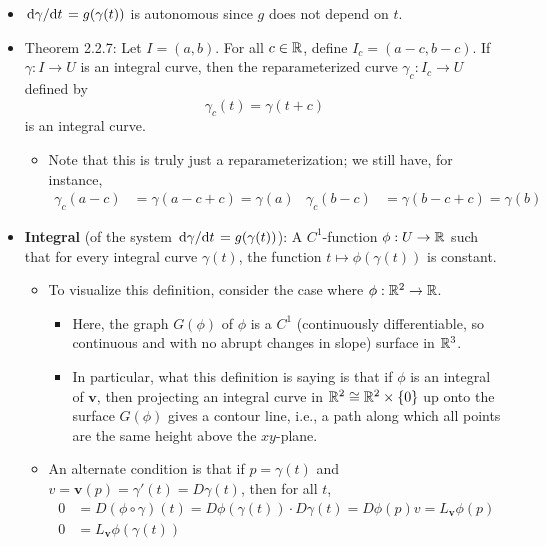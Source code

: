 \documentclass[../notes.tex]{subfiles}
\begin{document}
\begin{itemize}
    \item $\dv*{\gamma}{t}=g(\gamma(t))$ is autonomous since $g$ does not depend on $t$.
    \item Theorem 2.2.7: Let $I=(a,b)$. For all $c\in\mathbb{R}$, define $I_c=(a-c,b-c)$. If $\gamma:I\to U$ is an integral curve, then the reparameterized curve $\gamma_c:I_c\to U$ defined by
    \begin{equation*}
        \gamma_c(t) = \gamma(t+c)
    \end{equation*}
    is an integral curve.
    \begin{itemize}
        \item Note that this is truly just a reparameterization; we still have, for instance,
        \begin{align*}
            \gamma_c(a-c) &= \gamma(a-c+c) = \gamma(a)&
            \gamma_c(b-c) &= \gamma(b-c+c) = \gamma(b)
        \end{align*}
    \end{itemize}
    \item \textbf{Integral} (of the system $\dv*{\gamma}{t}=g(\gamma(t))$): A $C^1$-function $\phi:U\to\mathbb{R}$ such that for every integral curve $\gamma(t)$, the function $t\mapsto\phi(\gamma(t))$ is constant.
    \begin{itemize}
        \item To visualize this definition, consider the case where $\phi:\mathbb{R}^2\to\mathbb{R}$.
        \begin{itemize}
            \item Here, the graph $G(\phi)$ of $\phi$ is a $C^1$ (continuously differentiable, so continuous and with no abrupt changes in slope) surface in $\mathbb{R}^3$.
            \item In particular, what this definition is saying is that if $\phi$ is an integral of $\bm{v}$, then projecting an integral curve in $\mathbb{R}^2\cong\mathbb{R}^2\times\{0\}$ up onto the surface $G(\phi)$ gives a contour line, i.e., a path along which all points are the same height above the $xy$-plane.
        \end{itemize}
        \item An alternate condition is that if $p=\gamma(t)$ and $v=\bm{v}(p)=\gamma'(t)=D\gamma(t)$, then for all $t$,
        \begin{align*}
            0 &= D(\phi\circ\gamma)(t)
            = D\phi(\gamma(t))\cdot D\gamma(t)
            = D\phi(p)v
            = L_{\bm{v}}\phi(p)\\
            0 &= L_{\bm{v}}\phi(\gamma(t))
        \end{align*}

\end{itemize}
\end{itemize}
\end{document}
